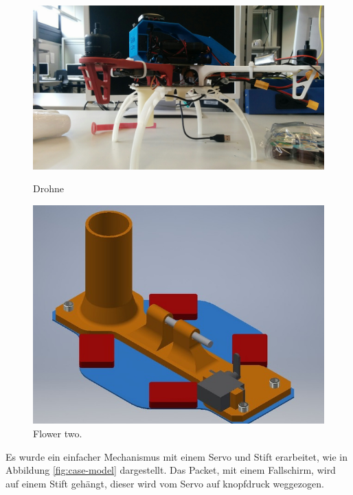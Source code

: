 \begin{figure}[H]
	\centering
	\begin{minipage}[b]{0.4\textwidth}
		\includegraphics[width=\textwidth]{images/hardware/drone-with-servo.jpg}
		\caption{Drohne }
	\end{minipage}
	\hfill
	\begin{minipage}[b]{0.4\textwidth}
		\includegraphics[width=\textwidth]{images/hardware/parachute-model.jpg}
		\caption{Flower two.}
	\end{minipage}
\end{figure}


Es wurde ein einfacher Mechanismus mit einem Servo und Stift erarbeitet, wie in Abbildung \ref{fig:case-model}  dargestellt. Das Packet, mit einem Fallschirm, wird auf einem Stift gehängt, dieser wird vom Servo auf knopfdruck weggezogen. 



